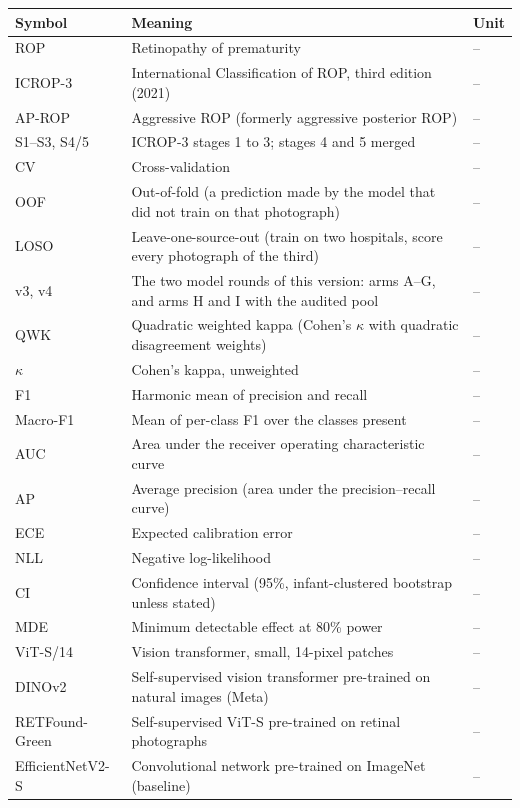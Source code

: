 \begingroup\TightTable
\begin{longtable}{@{}p{30mm}p{95mm}p{25mm}@{}}
\toprule Symbol & Meaning & Unit\\\midrule\endhead
ROP & Retinopathy of prematurity & --\\
ICROP-3 & International Classification of ROP, third edition (2021) & --\\
AP-ROP & Aggressive ROP (formerly aggressive posterior ROP) & --\\
S1--S3, S4/5 & ICROP-3 stages 1 to 3; stages 4 and 5 merged & --\\
CV & Cross-validation & --\\
OOF & Out-of-fold (a prediction made by the model that did not train on that photograph) & --\\
LOSO & Leave-one-source-out (train on two hospitals, score every photograph of the third) & --\\
v3, v4 & The two model rounds of this version: arms A--G, and arms H and I with the audited pool & --\\
QWK & Quadratic weighted kappa (Cohen's $\kappa$ with quadratic disagreement weights) & --\\
$\kappa$ & Cohen's kappa, unweighted & --\\
F1 & Harmonic mean of precision and recall & --\\
Macro-F1 & Mean of per-class F1 over the classes present & --\\
AUC & Area under the receiver operating characteristic curve & --\\
AP & Average precision (area under the precision--recall curve) & --\\
ECE & Expected calibration error & --\\
NLL & Negative log-likelihood & --\\
CI & Confidence interval (95\%, infant-clustered bootstrap unless stated) & --\\
MDE & Minimum detectable effect at 80\% power & --\\
ViT-S/14 & Vision transformer, small, 14-pixel patches & --\\
DINOv2 & Self-supervised vision transformer pre-trained on natural images (Meta) & --\\
RETFound-Green & Self-supervised ViT-S pre-trained on retinal photographs & --\\
EfficientNetV2-S & Convolutional network pre-trained on ImageNet (baseline) & --\\

\end{longtable}
